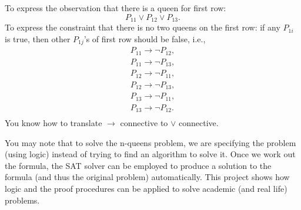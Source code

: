 \documentclass[12pt, letterpaper]{article}
\begin{document}
To express the observation that there is a queen for first row:
\[P_{11} \vee P_{12} \vee P_{13}.\]
To express the constraint that there is no two queens on the first
row: if any $P_{1i}$ is true, then other $P_{1j}$'s of first row
should be false, i.e.,
\[
\begin{array}{c}
  P_{11} \rightarrow \neg P_{12}, \\
  P_{11} \rightarrow \neg P_{13}, \\
  P_{12} \rightarrow \neg P_{11}, \\
  P_{12} \rightarrow \neg P_{13}, \\
  P_{13} \rightarrow \neg P_{11}, \\
  P_{13} \rightarrow \neg P_{12}. \\
\end{array}
\]
You know how to translate $\rightarrow$ connective to $\vee$
connective.

You may note that to solve the n-queens problem, we are specifying
the problem (using logic) instead of trying to find an algorithm to
solve it. Once we work out the formula, the SAT solver can be
employed to produce a solution to the formula (and thus the original
problem) automatically. This project shows how logic and the proof
procedures can be applied to solve academic (and real life)
problems.

\end{document}
